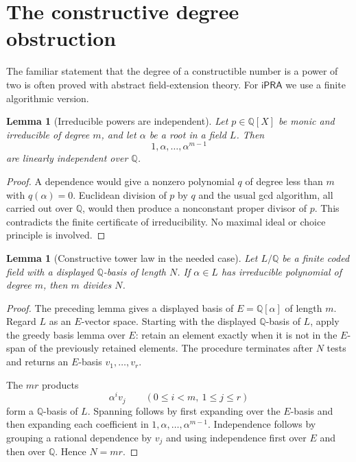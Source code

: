 \documentclass[11pt]{article}
\newtheorem{lemma}[theorem]{Lemma}
\newcommand{\Q}{\mathbb{Q}}
\newcommand{\ipra}{\mathsf{iPRA}}
\begin{document}
\section{The constructive degree obstruction}

The familiar statement that the degree of a constructible number is a power of two is often proved with abstract field-extension theory.  For $\ipra$ we use a finite algorithmic version.

\begin{lemma}[Irreducible powers are independent]
Let $p\in\Q[X]$ be monic and irreducible of degree $m$, and let $\alpha$ be a root in a field $L$.  Then
\[
  1,\alpha,\ldots,\alpha^{m-1}
\]
are linearly independent over $\Q$.
\end{lemma}

\begin{proof}
A dependence would give a nonzero polynomial $q$ of degree less than $m$ with $q(\alpha)=0$.  Euclidean division of $p$ by $q$ and the usual gcd algorithm, all carried out over $\Q$, would then produce a nonconstant proper divisor of $p$.  This contradicts the finite certificate of irreducibility.  No maximal ideal or choice principle is involved.
\end{proof}

\begin{lemma}[Constructive tower law in the needed case]
Let $L/\Q$ be a finite coded field with a displayed $\Q$-basis of length $N$.  If $\alpha\in L$ has irreducible polynomial of degree $m$, then $m$ divides $N$.
\end{lemma}

\begin{proof}
The preceding lemma gives a displayed basis of $E=\Q[\alpha]$ of length $m$.  Regard $L$ as an $E$-vector space.  Starting with the displayed $\Q$-basis of $L$, apply the greedy basis lemma over $E$: retain an element exactly when it is not in the $E$-span of the previously retained elements.  The procedure terminates after $N$ tests and returns an $E$-basis $v_1,\ldots,v_r$.

The $mr$ products
\[
  \alpha^i v_j\qquad(0\le i<m,\ 1\le j\le r)
\]
form a $\Q$-basis of $L$.  Spanning follows by first expanding over the $E$-basis and then expanding each coefficient in $1,\alpha,\ldots,\alpha^{m-1}$.  Independence follows by grouping a rational dependence by $v_j$ and using independence first over $E$ and then over $\Q$.  Hence $N=mr$.
\end{proof}
\end{document}
